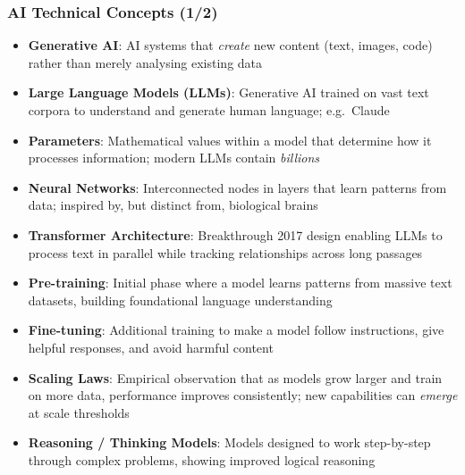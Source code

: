 \begin{frame}[fragile]\frametitle{AI Technical Concepts (1/2)}
      \begin{itemize}
        \item \textbf{Generative AI}: AI systems that \emph{create} new content (text, images, code) rather than merely analysing existing data
        \item \textbf{Large Language Models (LLMs)}: Generative AI trained on vast text corpora to understand and generate human language; e.g.\ Claude
        \item \textbf{Parameters}: Mathematical values within a model that determine how it processes information; modern LLMs contain \emph{billions}
        \item \textbf{Neural Networks}: Interconnected nodes in layers that learn patterns from data; inspired by, but distinct from, biological brains
        \item \textbf{Transformer Architecture}: Breakthrough 2017 design enabling LLMs to process text in parallel while tracking relationships across long passages
        \item \textbf{Pre-training}: Initial phase where a model learns patterns from massive text datasets, building foundational language understanding
        \item \textbf{Fine-tuning}: Additional training to make a model follow instructions, give helpful responses, and avoid harmful content
        \item \textbf{Scaling Laws}: Empirical observation that as models grow larger and train on more data, performance improves consistently; new capabilities can \emph{emerge} at scale thresholds
        \item \textbf{Reasoning / Thinking Models}: Models designed to work step-by-step through complex problems, showing improved logical reasoning
      \end{itemize}
\end{frame}

